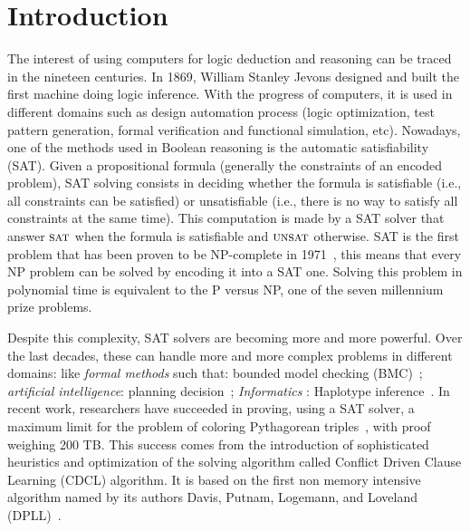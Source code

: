 ﻿\chapter{Introduction}\label{chap:intro}

The interest of using computers for logic deduction and reasoning can be traced in the nineteen centuries.
In 1869,  William Stanley Jevons designed and built the first machine doing logic inference.
With the progress of computers, it is used in different domains such as design automation process 
(logic optimization, test pattern generation, formal verification and functional simulation, etc).
Nowadays, one of the methods used in Boolean reasoning is the automatic satisfiability (SAT).
Given a propositional formula (generally the constraints of an encoded problem),
SAT solving consists in deciding whether the formula is satisfiable (i.e., all constraints can be
satisfied) or unsatisfiable (i.e., there is no way to satisfy all constraints at the same time).
This computation is made by a SAT solver that answer $\textsc{sat}$ when the formula is satisfiable
and $\textsc{unsat}$ otherwise.
SAT is the first problem that has been proven to be NP-complete in 1971~\cite{cook1971complexity}, this 
means that every NP problem can be solved by encoding it into a SAT one. Solving this problem in 
polynomial time is equivalent to the P versus NP, one of the seven millennium prize problems.

Despite this complexity, SAT solvers are becoming more and more powerful.
Over the last decades, these can handle more and more complex problems in different domains:
like \emph{formal methods} such that: bounded model checking (BMC)~\cite{bmc_99}; \emph{artificial intelligence}: planning decision~\cite{planning_92}; \emph{Informatics} : Haplotype inference~\cite{biology_06}.
In recent work, researchers have succeeded in proving, using a SAT solver, a maximum limit
for the problem of coloring Pythagorean triples~\cite{heule2016solving}, with proof weighing 200 TB.
This success comes from the introduction of sophisticated heuristics and optimization of the solving 
algorithm called Conflict Driven Clause Learning (CDCL) algorithm. It is based on the first non memory
intensive algorithm named by its authors Davis, Putnam, Logemann, and Loveland (DPLL)~\cite{dpll_62}.

